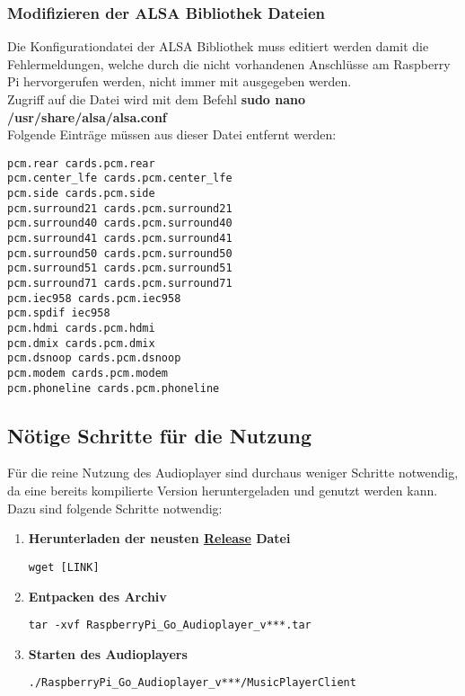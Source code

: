 \subsubsection{Modifizieren der ALSA Bibliothek Dateien}
Die Konfigurationdatei der ALSA Bibliothek muss editiert werden damit die Fehlermeldungen, welche durch die nicht vorhandenen Anschlüsse am Raspberry Pi hervorgerufen werden, nicht immer mit ausgegeben werden. \\
Zugriff auf die Datei wird mit dem Befehl \textbf{sudo nano /usr/share/alsa/alsa.conf}  \\
Folgende Einträge müssen aus dieser Datei entfernt werden:
\begin{lstlisting}[caption={Liste der zu löschenden Einträge}]
pcm.rear cards.pcm.rear 
pcm.center_lfe cards.pcm.center_lfe 
pcm.side cards.pcm.side 
pcm.surround21 cards.pcm.surround21 
pcm.surround40 cards.pcm.surround40 
pcm.surround41 cards.pcm.surround41 
pcm.surround50 cards.pcm.surround50 
pcm.surround51 cards.pcm.surround51 
pcm.surround71 cards.pcm.surround71 
pcm.iec958 cards.pcm.iec958 
pcm.spdif iec958 
pcm.hdmi cards.pcm.hdmi 
pcm.dmix cards.pcm.dmix 
pcm.dsnoop cards.pcm.dsnoop 
pcm.modem cards.pcm.modem 
pcm.phoneline cards.pcm.phoneline
\end{lstlisting}

\subsection{Nötige Schritte für die Nutzung}
Für die reine Nutzung des Audioplayer sind durchaus weniger Schritte notwendig, da eine bereits kompilierte Version heruntergeladen und genutzt werden kann.
Dazu sind folgende Schritte notwendig:
\begin{enumerate}
\item \textbf{Herunterladen der neusten \href{https://github.com/alexanderklapdor/RaspberryPi_Go_Audioplayer/releases}{Release} Datei}  \\
\begin{lstlisting}
wget [LINK]
\end{lstlisting}

\item \textbf{Entpacken des Archiv} \\
\begin{lstlisting}
tar -xvf RaspberryPi_Go_Audioplayer_v***.tar
\end{lstlisting}

\item \textbf{Starten des Audioplayers} \\
\begin{lstlisting}
./RaspberryPi_Go_Audioplayer_v***/MusicPlayerClient
\end{lstlisting}
\end{enumerate}

